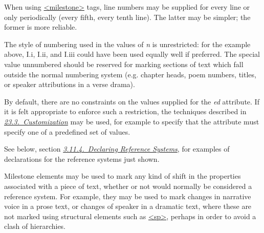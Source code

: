 When using \hyperref[TEI.milestone]{<milestone>} tags, line numbers may be supplied for every line or only periodically (every fifth, every tenth line). The latter may be simpler; the former is more reliable.\par
The style of numbering used in the values of {\itshape n} is unrestricted: for the example above, I.i, I.ii, and I.iii could have been used equally well if preferred. The special value unnumbered should be reserved for marking sections of text which fall outside the normal numbering system (e.g. chapter heads, poem numbers, titles, or speaker attributions in a verse drama).\par
By default, there are no constraints on the values supplied for the {\itshape ed} attribute. If it is felt appropriate to enforce such a restriction, the techniques described in \textit{\hyperref[MD]{23.3.\ Customization}} may be used, for example to specify that the attribute must specify one of a predefined set of values.\par
See below, section \textit{\hyperref[CORS6]{3.11.4.\ Declaring Reference Systems}}, for examples of declarations for the reference systems just shown.\par
Milestone elements may be used to mark any kind of shift in the properties associated with a piece of text, whether or not would normally be considered a reference system. For example, they may be used to mark changes in narrative voice in a prose text, or changes of speaker in a dramatic text, where these are not marked using structural elements such as \hyperref[TEI.sp]{<sp>}, perhaps in order to avoid a clash of hierarchies.\par
